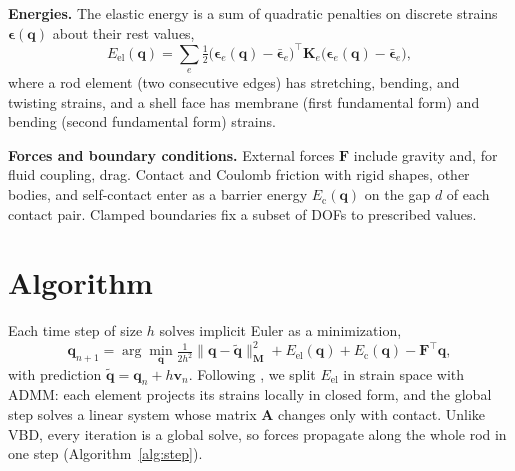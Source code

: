 \documentclass[letterpaper, 10 pt, conference]{ieeeconf}  %
\begin{document}
\textbf{Energies.} The elastic energy is a sum of quadratic penalties on discrete strains $\boldsymbol{\epsilon}(\mathbf{q})$ about their rest values,
\begin{equation}
    E_\text{el}(\mathbf{q}) = \sum_{e} \tfrac{1}{2}\big(\boldsymbol{\epsilon}_e(\mathbf{q}) - \bar{\boldsymbol{\epsilon}}_e\big)^{\!\top} \mathbf{K}_e \big(\boldsymbol{\epsilon}_e(\mathbf{q}) - \bar{\boldsymbol{\epsilon}}_e\big),
\end{equation}
where a rod element (two consecutive edges) has stretching, bending, and twisting strains, and a shell face has membrane (first fundamental form) and bending (second fundamental form) strains.

\textbf{Forces and boundary conditions.} External forces $\mathbf{F}$ include gravity and, for fluid coupling, drag. Contact and Coulomb friction with rigid shapes, other bodies, and self-contact enter as a barrier energy $E_\text{c}(\mathbf{q})$ on the gap $d$ of each contact pair. Clamped boundaries fix a subset of DOFs to prescribed values.

\section{Algorithm}

Each time step of size $h$ solves implicit Euler as a minimization,
\begin{equation}
    \mathbf{q}_{n+1} = \arg\min_{\mathbf{q}} \tfrac{1}{2h^2}\|\mathbf{q} - \tilde{\mathbf{q}}\|^2_\mathbf{M} + E_\text{el}(\mathbf{q}) + E_\text{c}(\mathbf{q}) - \mathbf{F}^\top\mathbf{q},
    \label{eq:ip}
\end{equation}
with prediction $\tilde{\mathbf{q}} = \mathbf{q}_n + h\mathbf{v}_n$.
Following \cite{daviet2023admm}, we split $E_\text{el}$ in strain space with ADMM: each element projects its strains locally in closed form, and the global step solves a linear system whose matrix $\mathbf{A}$ changes only with contact.
Unlike VBD, every iteration is a global solve, so forces propagate along the whole rod in one step (Algorithm~\ref{alg:step}).
\end{document}
